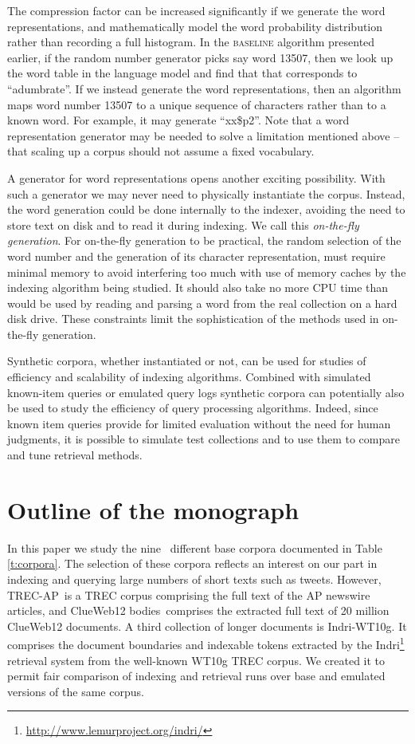 \documentclass[11pt]{report}
\newcommand{\TRECAP}{TREC-AP}
\newcommand{\clueWebBodiesLarge}{ClueWeb12 bodies}
\newcommand{\IndriWT}{Indri-WT10g}
\newcommand{\numcolls}{nine}
\begin{document}
The compression factor can be increased significantly if we generate the word
representations, and mathematically model the word probability
distribution rather than recording a full histogram.  In the \textsc{baseline} algorithm
presented earlier, if the random number generator picks say word 13507, then
we look up the word table in the language model and find that that 
corresponds to ``adumbrate''.  If we instead generate the word
representations, then an algorithm maps word number 13507 to a unique
sequence of characters rather than to a known word.  For example, it
may generate ``xx\$p2''.  Note that a word representation generator
may be
needed to solve a limitation mentioned above -- that scaling up a
corpus should not assume a fixed vocabulary.

A generator for word representations opens another exciting
possibility.  With such a generator we may never need to physically
instantiate the corpus.  Instead, the word generation could be done
internally to the indexer, avoiding the need to store text on disk and
to read it during indexing.  We call this \textit{on-the-fly generation}.
For on-the-fly generation to be practical, the random selection
of the word number and the generation of its character representation,
must require minimal memory to avoid interfering too much
 with use of memory
caches by the indexing algorithm being studied.  It should also
take no more CPU time than would be used by reading and parsing
a word from the real collection on a hard disk drive.  These
constraints limit the sophistication of the methods used in on-the-fly
generation. 

Synthetic corpora, whether instantiated or not, can be used
for studies of efficiency and scalability of indexing algorithms.
Combined with simulated known-item queries or emulated query logs
synthetic corpora can potentially also be used to study the efficiency
of query processing algorithms.  Indeed, since known item queries
provide for limited evaluation without the need for human judgments, 
it is possible to simulate test collections and to use them to compare
and tune retrieval methods.

\section{Outline of the monograph}
In this paper we study the \numcolls~ different base corpora documented in 
Table \ref{t:corpora}.  The selection of these corpora
 reflects an interest on our
part in indexing and querying large numbers of short texts such as
tweets. However, \TRECAP~is a TREC corpus comprising the full text of
the AP newswire articles, and \clueWebBodiesLarge~comprises the 
extracted full text of 20 million ClueWeb12 documents.  A third 
collection of longer documents is \IndriWT.  It comprises the 
document boundaries and indexable tokens extracted by the 
Indri\footnote{\url{http://www.lemurproject.org/indri/}}
retrieval system from the well-known WT10g TREC corpus. We
created it to permit fair comparison of indexing and retrieval runs over base and
emulated versions of the same corpus.
\end{document}
